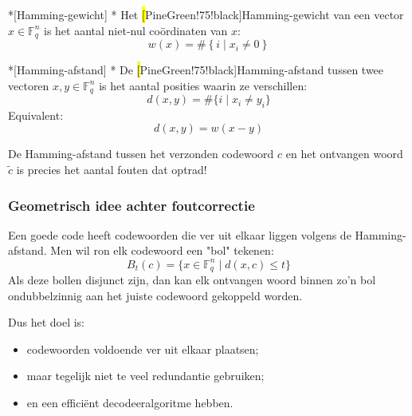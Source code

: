 \begin{nicedefinition}*[Hamming-gewicht]\label{def:l8_hamming-w}
    \nextpart[]*
    Het \hl[PineGreen!75!black]{Hamming-gewicht} van een vector $x \in \mathbb{F}_q^n$ is het aantal niet-nul coördinaten van $x$:
    \begin{equation*}
        w(x) = \#\left\{i \mid x_i \neq 0\right\}
    \end{equation*}
\end{nicedefinition}

\begin{nicedefinition}*[Hamming-afstand]\label{def:l8_hamming-d}
    \nextpart[]*
    De \hl[PineGreen!75!black]{Hamming-afstand} tussen twee vectoren $x,y \in \mathbb{F}_q^n$ is het aantal posities waarin ze verschillen:
    \begin{equation*}
        d(x,y) = \#\{i \mid x_i \neq y_i\}
    \end{equation*}
    Equivalent:
    \begin{equation*}
        d(x,y) = w(x - y)
    \end{equation*}
\end{nicedefinition}

De Hamming-afstand tussen het verzonden codewoord $c$ en het ontvangen woord $\tilde{c}$ is precies het aantal fouten dat optrad!

\subsubsection{Geometrisch idee achter foutcorrectie}

Een goede code heeft codewoorden die ver uit elkaar liggen volgens de Hamming-afstand. Men wil ron elk codewoord een "bol" tekenen:
\begin{equation*}
    B_t(c) = \{x \in \mathbb{F}_q^n \mid d(x,c) \le t\}
\end{equation*}
Als deze bollen disjunct zijn, dan kan elk ontvangen woord binnen zo'n bol ondubbelzinnig aan het juiste codewoord gekoppeld worden.

\begin{center}
\resizebox{1.00\textwidth}{!}{%
    
}
\end{center}

Dus het doel is:
\begin{itemize}
    \item codewoorden voldoende ver uit elkaar plaatsen;
    \item maar tegelijk niet te veel redundantie gebruiken;
    \item en een efficiënt decodeeralgoritme hebben.
\end{itemize}

